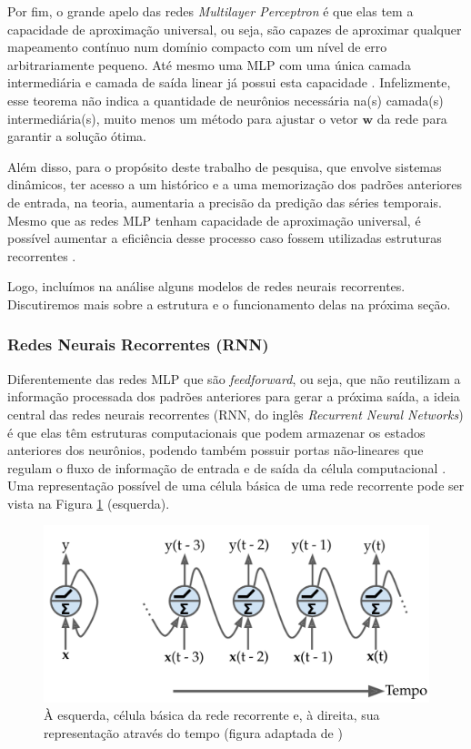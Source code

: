 \documentclass[a4paper, 12pt]{article}
\begin{document}
Por fim, o grande apelo das redes \textit{Multilayer Perceptron} é que elas tem a capacidade de aproximação universal, ou seja, são capazes de aproximar qualquer mapeamento contínuo num domínio compacto com um nível de erro arbitrariamente pequeno. Até mesmo uma MLP com uma única camada intermediária e camada de saída linear já possui esta capacidade \cite{cybenko1989approximation, hornik1989multilayer}. Infelizmente, esse teorema não indica a quantidade de neurônios necessária na(s) camada(s) intermediária(s), muito menos um método para ajustar o vetor $\mathbf{w}$ da rede para garantir a solução ótima.

Além disso, para o propósito deste trabalho de pesquisa, que envolve sistemas dinâmicos, ter acesso a um histórico e a uma memorização dos padrões anteriores de entrada, na teoria, aumentaria a precisão da predição das séries temporais. Mesmo que as redes MLP tenham capacidade de aproximação universal, é possível aumentar a eficiência desse processo caso fossem utilizadas estruturas recorrentes \cite{connor1994recurrent, boccato2013novas}.

Logo, incluímos na análise alguns modelos de redes neurais recorrentes. Discutiremos mais sobre a estrutura e o funcionamento delas na próxima seção.

\subsubsection{Redes Neurais Recorrentes (RNN)} 
Diferentemente das redes MLP que são \textit{feedforward}, ou seja, que não reutilizam a informação processada dos padrões anteriores para gerar a próxima saída, a ideia central das redes neurais recorrentes (RNN, do inglês \textit{Recurrent Neural Networks}) é que elas têm estruturas computacionais que podem armazenar os estados anteriores dos neurônios, podendo também possuir portas não-lineares que regulam o fluxo de informação de entrada e de saída da célula computacional \cite{haykin2010neural}. Uma representação possível de uma célula básica de uma rede recorrente pode ser vista na Figura \ref{fig:recorrente-cell} (esquerda).
\begin{figure}[H]
\centering
\includegraphics[scale = 0.2]{rnn-cell.pdf}
\caption{À esquerda, célula básica da rede recorrente e, à direita, sua representação através do tempo (figura adaptada de \cite{geron2019hands})}
\label{fig:recorrente-cell}
\end{figure}
\end{document}
